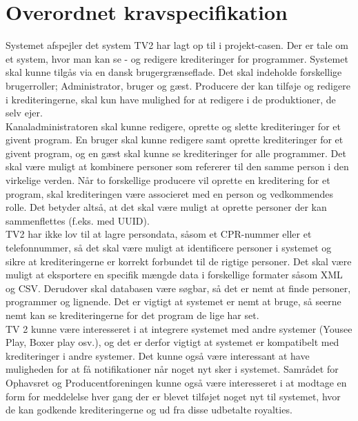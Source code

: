 \section{Overordnet kravspecifikation}
Systemet afspejler det system TV2 har lagt op til i projekt-casen. Der er tale om et system, hvor man kan se - og redigere krediteringer for programmer. Systemet skal kunne tilgås via en dansk brugergrænseflade. Det skal indeholde forskellige brugerroller; Administrator, bruger og gæst. Producere der kan tilføje og redigere i krediteringerne, skal kun have mulighed for at redigere i de produktioner, de selv ejer.\\

\noindent
Kanaladministratoren skal kunne redigere, oprette og slette krediteringer for et givent program. En bruger skal kunne redigere samt oprette krediteringer for et givent program, og en gæst skal kunne se krediteringer for alle programmer. Det skal være muligt at kombinere personer som refererer til den samme person i den virkelige verden. Når to forskellige producere vil oprette en kreditering for et program, skal krediteringen være associeret med en person og vedkommendes rolle. Det betyder altså, at det skal være muligt at oprette personer der kan sammenflettes (f.eks. med UUID).\\

\noindent
TV2 har ikke lov til at lagre persondata, såsom et CPR-nummer eller et telefonnummer, så det skal være muligt at identificere personer i systemet og sikre at krediteringerne er korrekt forbundet til de rigtige personer.
Det skal være muligt at eksportere en specifik mængde data i forskellige formater såsom XML og CSV. Derudover skal databasen være søgbar, så det er nemt at finde personer, programmer og lignende. Det er vigtigt at systemet er nemt at bruge, så seerne nemt kan se krediteringerne for det program de lige har set.\\

\noindent
TV 2 kunne være interesseret i at integrere systemet med andre systemer (Yousee Play, Boxer play osv.), og det er derfor vigtigt at systemet er kompatibelt med krediteringer i andre systemer. Det kunne også være interessant at have muligheden for at få notifikationer når noget nyt sker i systemet. Samrådet for Ophavsret og Producentforeningen kunne også være interesseret i at modtage en form for meddelelse hver gang der er blevet tilføjet noget nyt til systemet, hvor de kan godkende krediteringerne og ud fra disse udbetalte royalties.\\

